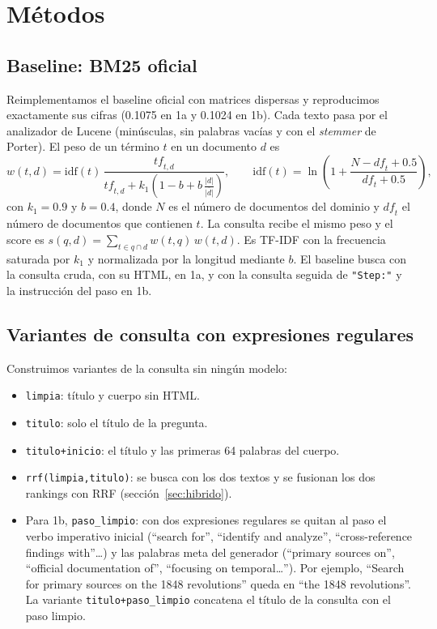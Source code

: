 \documentclass[11pt,a4paper]{article}
\begin{document}
\section{Métodos}
\label{sec:metodos}

\subsection{Baseline: BM25 oficial}
\label{sec:bm25}

Reimplementamos el baseline oficial con matrices dispersas y reproducimos exactamente sus cifras (0.1075 en 1a y 0.1024 en 1b). Cada texto pasa por el analizador de Lucene (minúsculas, sin palabras vacías y con el \emph{stemmer} de Porter). El peso de un término $t$ en un documento $d$ es
\begin{equation}
w(t,d) = \mathrm{idf}(t)\,\frac{\mathit{tf}_{t,d}}{\mathit{tf}_{t,d} + k_1\left(1 - b + b\,\frac{|d|}{\overline{|d|}}\right)}, \qquad
\mathrm{idf}(t) = \ln\!\left(1 + \frac{N - \mathit{df}_t + 0.5}{\mathit{df}_t + 0.5}\right),
\end{equation}
con $k_1 = 0.9$ y $b = 0.4$, donde $N$ es el número de documentos del dominio y $\mathit{df}_t$ el número de documentos que contienen $t$. La consulta recibe el mismo peso y el score es $s(q,d) = \sum_{t \in q \cap d} w(t,q)\, w(t,d)$. Es TF-IDF con la frecuencia saturada por $k_1$ y normalizada por la longitud mediante $b$. El baseline busca con la consulta cruda, con su HTML, en 1a, y con la consulta seguida de \texttt{"Step:"} y la instrucción del paso en 1b.

\subsection{Variantes de consulta con expresiones regulares}
\label{sec:variantes}

Construimos variantes de la consulta sin ningún modelo:
\begin{itemize}
  \item \texttt{limpia}: título y cuerpo sin HTML.
  \item \texttt{titulo}: solo el título de la pregunta.
  \item \texttt{titulo+inicio}: el título y las primeras 64 palabras del cuerpo.
  \item \texttt{rrf(limpia,titulo)}: se busca con los dos textos y se fusionan los dos rankings con RRF (sección~\ref{sec:hibrido}).
  \item Para 1b, \texttt{paso\_limpio}: con dos expresiones regulares se quitan al paso el verbo imperativo inicial (``search for'', ``identify and analyze'', ``cross-reference findings with''\ldots) y las palabras meta del generador (``primary sources on'', ``official documentation of'', ``focusing on temporal\ldots''). Por ejemplo, ``Search for primary sources on the 1848 revolutions'' queda en ``the 1848 revolutions''. La variante \texttt{titulo+paso\_limpio} concatena el título de la consulta con el paso limpio.
\end{itemize}
\end{document}
